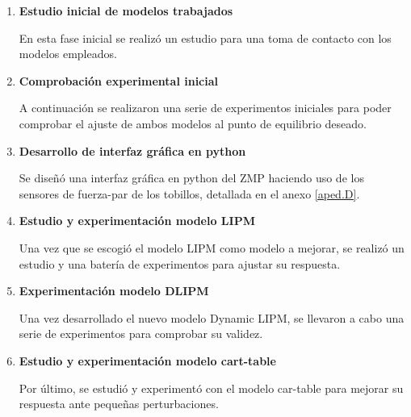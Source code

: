 \begin{enumerate}

\item \textbf{Estudio inicial de modelos trabajados}

En esta fase inicial se realizó un estudio para una toma de contacto con los modelos empleados.

\item \textbf{Comprobación experimental inicial}

A continuación se realizaron una serie de experimentos iniciales para poder comprobar el ajuste de ambos modelos al punto de equilibrio deseado.

\item \textbf{Desarrollo de interfaz gráfica en python}

Se diseñó una interfaz gráfica en python del ZMP haciendo uso de los sensores de fuerza-par de los tobillos, detallada en el anexo \ref{aped.D}.

\item \textbf{Estudio y experimentación modelo LIPM}

Una vez que se escogió el modelo LIPM como modelo a mejorar, se realizó un estudio y una batería de experimentos para ajustar su respuesta.

\item \textbf{Experimentación modelo DLIPM}

Una vez desarrollado el nuevo modelo Dynamic LIPM, se llevaron a cabo una serie de experimentos para comprobar su validez.

\item \textbf{Estudio y experimentación modelo cart-table}

Por último, se estudió y experimentó con el modelo car-table para mejorar su respuesta ante pequeñas perturbaciones.

\end{enumerate}

\afterpage{\null\newpage}
\newpage

